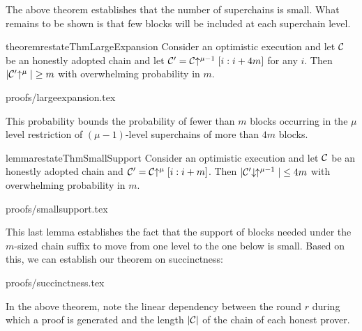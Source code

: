 The above theorem establishes that the number of superchains is small. What
remains to be shown is that few blocks will be included at each superchain
level.

\begin{restatable}{theorem}{restateThmLargeExpansion}
    \label{thm.large-expansion}
    Consider an optimistic execution and let $\mathcal{C}$ be an honestly adopted
    chain and let $\mathcal{C}' = \mathcal{C}\negthickspace\uparrow^{\mu - 1}[i:i + 4m]$ for any $i$.
    Then $|\mathcal{C}'\negthickspace\uparrow^\mu| \geq m$ with overwhelming probability in $m$.
\end{restatable}
\ifonecolumn
{proofs/largeexpansion.tex}
\fi

This probability bounds the probability of fewer than $m$ blocks occurring in
the $\mu$ level restriction of $(\mu - 1)$-level superchains of more than $4m$
blocks.

\begin{restatable}{lemma}{restateThmSmallSupport}
    \label{lem.small-support}
    Consider an optimistic execution and let $\mathcal{C}$ be an honestly adopted
    chain and $\mathcal{C}' = \mathcal{C}\negthickspace\uparrow^\mu[i:i + m]$. Then
    $|\mathcal{C}'\negthickspace\downarrow\,\negthickspace\uparrow^{\mu - 1}| \leq 4m$ with overwhelming
    probability in $m$.
\end{restatable}
\ifonecolumn
{proofs/smallsupport.tex}
\fi

This last lemma establishes the fact that the support of blocks needed under
the $m$-sized chain suffix to move from one level to the one below is small.
Based on this, we can establish our theorem on succinctness:

\restateThmSuccinctness
\ifonecolumn
{proofs/succinctness.tex}
\fi

In the above theorem, note the linear dependency between the round $r$ during
which a proof is generated and the length $|\mathcal{C}|$ of the chain of each honest
prover.
